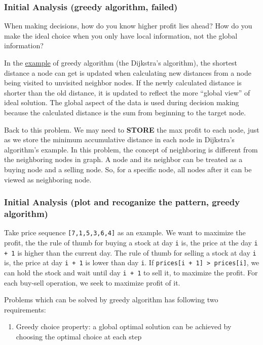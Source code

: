 \documentclass[11pt]{article}
\begin{document}
\subsubsection{Initial Analysis (greedy algorithm, failed)}
\label{sec:orgb0f4f82}
When making decisions, how do you know higher profit lies ahead? How do you make the ideal choice when you only have local information, not the global information?

In the \href{https://brilliant.org/wiki/greedy-algorithm/}{example} of greedy algorithm (the Dijkstra's algorithm), the shortest distance a node can get is updated when calculating new distances from a node being visited to unvisited neighbor nodes. If the newly calculated distance is shorter than the old distance, it is updated to reflect the more ``global view'' of ideal solution. The global aspect of the data is used during decision making because the calculated distance is the sum from beginning to the target node.

Back to this problem. We may need to \textbf{STORE} the max profit to each node, just as we store the minimum accumulative distance in each node in Dijkstra's algorithm's example. In this problem, the concept of neighboring is different from the neighboring nodes in graph. A node and its neighbor can be treated as a buying node and a selling node. So, for a specific node, all nodes after it can be viewed as neighboring node.
\subsubsection{Initial Analysis (plot and recoganize the pattern, greedy algorithm)}
\label{sec:orgd5c5adf}
Take price sequence \texttt{[7,1,5,3,6,4]} as an example. We want to maximize the profit, the the rule of thumb for buying a stock at day \texttt{i} is, the price at the day \texttt{i + 1} is higher than the current day. The rule of thumb for selling a stock at day \texttt{i} is, the price at day \texttt{i + 1} is lower than day \texttt{i}. If \texttt{prices[i + 1] > prices[i]}, we can hold the stock and wait until day \texttt{i + 1} to sell it, to maximize the profit. For each buy-sell operation, we seek to maximize profit of it.

Problems which can be solved by greedy algorithm has following two requirements:
\begin{enumerate}
\item Greedy choice property: a global optimal solution can be achieved by choosing the optimal choice at each step
\item Optimal substructure: a global optimal solution contains all optimal solutions to the sub-problems
\end{enumerate}
\end{document}
